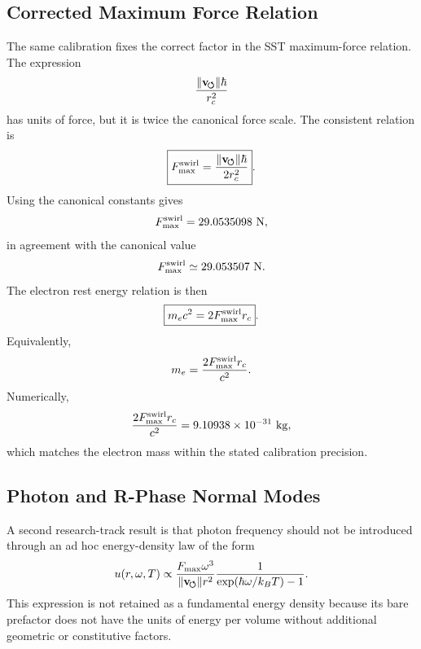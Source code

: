 \subsection{Corrected Maximum Force Relation}
    
    The same calibration fixes the correct factor in the SST maximum-force
    relation.  The expression
    \begin{equation}
        \frac{\lVert\mathbf{v}_{\!\boldsymbol{\circlearrowleft}}\rVert\hbar}{r_c^2}
    \end{equation}
    has units of force, but it is twice the canonical force scale.  The
    consistent relation is
    \begin{equation}
        \boxed{
            F_{\max}^{\rm swirl}
            =
            \frac{\lVert\mathbf{v}_{\!\boldsymbol{\circlearrowleft}}\rVert\hbar}{2r_c^2}
        } .
        \label{eq:Fmax_corrected}
    \end{equation}
    Using the canonical constants gives
    \begin{equation}
        F_{\max}^{\rm swirl}
        =
        29.0535098\ {\rm N},
    \end{equation}
    in agreement with the canonical value
    \begin{equation}
        F_{\max}^{\rm swirl}
        \simeq
        29.053507\ {\rm N}.
    \end{equation}
    The electron rest energy relation is then
    \begin{equation}
        \boxed{
            m_ec^2
            =
            2F_{\max}^{\rm swirl} r_c
        } .
        \label{eq:electron_energy_force_core}
    \end{equation}
    Equivalently,
    \begin{equation}
        m_e
        =
        \frac{2F_{\max}^{\rm swirl}r_c}{c^2}.
    \end{equation}
    Numerically,
    \begin{equation}
        \frac{2F_{\max}^{\rm swirl}r_c}{c^2}
        =
        9.10938\times10^{-31}\ {\rm kg},
    \end{equation}
    which matches the electron mass within the stated calibration precision.

\subsection{Photon and R-Phase Normal Modes}
    
    A second research-track result is that photon frequency should not be
    introduced through an ad hoc energy-density law of the form
    \begin{equation}
        u(r,\omega,T)
        \propto
        \frac{F_{\max}\omega^3}{\lVert\mathbf{v}_{\!\boldsymbol{\circlearrowleft}}\rVert r^2}
        \frac{1}{\exp(\hbar\omega/k_BT)-1}.
        \label{eq:rejected_photon_density}
    \end{equation}
    This expression is not retained as a fundamental energy density because
    its bare prefactor does not have the units of energy per volume without
    additional geometric or constitutive factors.
    

